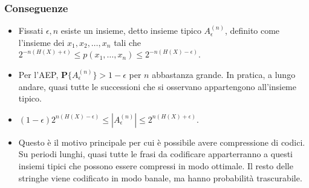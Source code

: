 \documentclass{beamer}
\theoremstyle{plain}
\theoremstyle{definition}
\theoremstyle{remark}
\newcommand{\Pro}{\mathbf{P}}
\begin{document}
\begin{frame}
\frametitle{Conseguenze}
\begin{itemize}
\item Fissati $\epsilon, n$ esiste un insieme, detto insieme tipico $A^{(n)}_\epsilon$, definito come l'insieme dei $x_1,x_2,\ldots, x_n$ tali che $2^{-n(H(X)+\epsilon)}\leq p(x_1,\ldots, x_n)\leq 2^{-n(H(X)-\epsilon)}$.
\item Per l'AEP, $\Pro\{A_\epsilon^{(n)}\}> 1-\epsilon$ per $n$ abbastanza grande. In pratica, a lungo andare, quasi tutte le successioni che si osservano appartengono all'insieme tipico.
\item $(1-\epsilon)2^{n(H(X)-\epsilon)}\leq |A^{(n)}_\epsilon| \leq 2^{n(H(X)+\epsilon)}$.
\item Questo è il motivo principale per cui è possibile avere compressione di codici. Su periodi lunghi, quasi tutte le frasi da codificare apparterranno a questi insiemi tipici che possono essere compressi in modo ottimale. Il resto delle stringhe viene codificato in modo banale, ma hanno probabilità trascurabile.
\end{itemize}
\hyperlink{Codici}{}
\end{frame}




\end{document}
